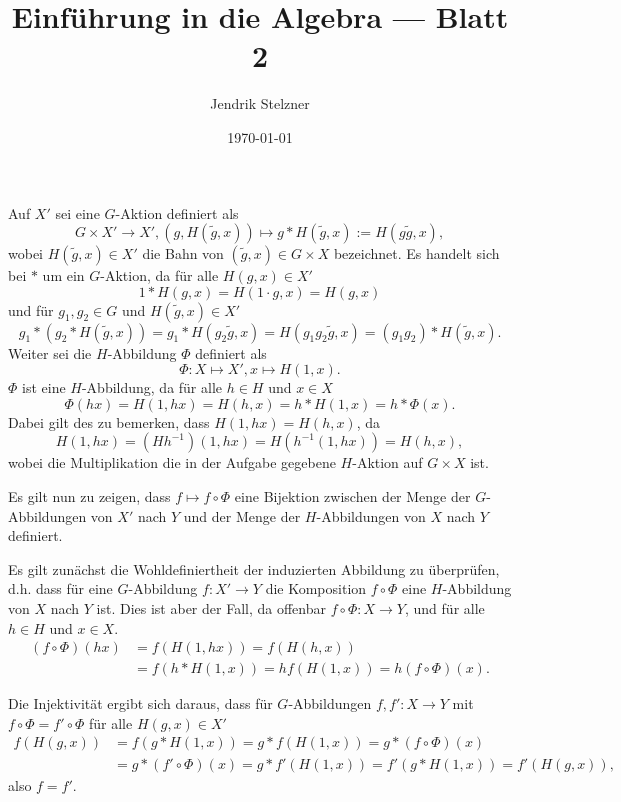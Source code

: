 \documentclass[a4paper,10pt]{article}
\title{Einführung in die Algebra — Blatt 2}
\author{Jendrik Stelzner}
\date{\today}
\theoremstyle{definition}
\begin{document}
\maketitle





\section{}
Auf $X'$ sei eine $G$-Aktion definiert als
\[
 G \times X' \rightarrow X', (g,H(\tilde{g},x)) \mapsto g * H(\tilde{g},x) := H(g \tilde{g}, x),
\]
wobei $H(\tilde{g},x) \in X'$ die Bahn von $(\tilde{g},x) \in G \times X$ bezeichnet. Es handelt sich bei $*$ um ein $G$-Aktion, da für alle $H(g,x) \in X'$
\[
 1 * H(g,x) = H(1 \cdot g, x) = H(g,x)
\]
und für $g_1, g_2 \in G$ und $H(\tilde{g},x) \in X'$
\[
 g_1 * (g_2 * H(\tilde{g},x))
 = g_1 * H(g_2 \tilde{g}, x)
 = H(g_1 g_2 \tilde{g}, x)
 = (g_1 g_2) * H(\tilde{g},x).
\]
Weiter sei die $H$-Abbildung $\Phi$ definiert als
\[
 \Phi : X \mapsto X', x \mapsto H(1,x).
\]
$\Phi$ ist eine $H$-Abbildung, da für alle $h \in H$ und $x \in X$
\[
 \Phi(hx) = H(1,hx) = H(h,x) = h * H(1,x) = h * \Phi(x).
\]
Dabei gilt des zu bemerken, dass $H(1,hx) = H(h,x)$, da
\[
 H(1,hx) = (H h^{-1}) (1,hx) = H (h^{-1}(1,hx)) = H(h,x),
\]
wobei die Multiplikation die in der Aufgabe gegebene $H$-Aktion auf $G \times X$ ist.

Es gilt nun zu zeigen, dass $f \mapsto f \circ \Phi$ eine Bijektion zwischen der Menge der $G$-Abbildungen von $X'$ nach $Y$ und der Menge der $H$-Abbildungen von $X$ nach $Y$ definiert.

Es gilt zunächst die Wohldefiniertheit der induzierten Abbildung zu überprüfen, d.h. dass für eine $G$-Abbildung $f : X' \rightarrow Y$ die Komposition $f \circ \Phi$ eine $H$-Abbildung von $X$ nach $Y$ ist. Dies ist aber der Fall, da offenbar $f \circ \Phi : X \rightarrow Y$, und für alle $h \in H$ und $x \in X$.
\begin{align*}
 (f \circ \Phi)(hx)
 &= f( H(1,hx) )
 = f( H(h,x) ) \\
 &= f(h * H(1,x) )
 = h f( H(1,x) )
 = h (f \circ \Phi)(x).
\end{align*}

Die Injektivität ergibt sich daraus, dass für $G$-Abbildungen $f, f' : X \rightarrow Y$ mit $f \circ \Phi = f' \circ \Phi$ für alle $H(g,x) \in X'$
\begin{align*}
 f( H(g,x) )
 &= f( g * H(1,x) )
 = g * f( H(1,x) )
 = g * (f \circ \Phi)(x) \\
 &= g * (f' \circ \Phi)(x)
 = g * f'( H(1,x) )
 = f'( g * H(1,x) )
 = f'( H(g,x) ),
\end{align*}
also $f = f'$.
\end{document}
